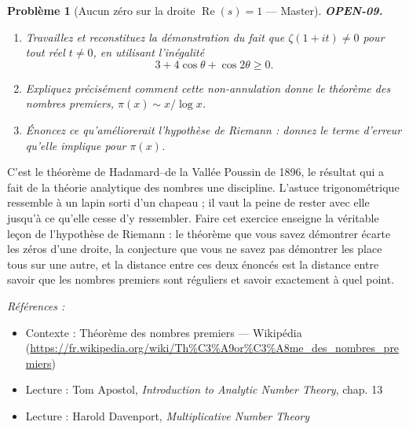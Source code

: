 \documentclass[11pt]{article}
\newtheorem{problem}{Problème}
\newenvironment{refs}{\par\small\noindent\emph{Références :}\begin{itemize}\setlength\itemsep{0pt}}{\end{itemize}\normalsize}
\begin{document}
\begin{problem}[{Aucun zéro sur la droite $ \operatorname{Re}(s) = 1 $ --- Master}]
\textbf{OPEN-09.} \begin{enumerate}
\item[(a)] Travaillez et reconstituez la démonstration du fait que $ \zeta(1 + it) \neq 0 $
pour tout réel $ t \neq 0 $, en utilisant l'inégalité
\[ 3 + 4\cos\theta + \cos 2\theta \geq 0 . \]
\item[(b)] Expliquez précisément comment cette non-annulation donne le théorème des nombres
premiers, $ \pi(x) \sim x / \log x $.
\item[(c)] Énoncez ce qu'améliorerait l'hypothèse de Riemann : donnez le terme d'erreur qu'elle
implique pour $ \pi(x) $.
\end{enumerate}

\end{problem}

\noindent C'est le théorème de Hadamard--de la Vallée Poussin de 1896, le résultat
qui a fait de la théorie analytique des nombres une discipline. L'astuce
trigonométrique ressemble à un lapin sorti d'un chapeau ; il vaut la peine de rester avec
elle jusqu'à ce qu'elle cesse d'y ressembler. Faire cet exercice enseigne la véritable
leçon de l'hypothèse de Riemann : le théorème que vous savez démontrer écarte les zéros
d'une droite, la conjecture que vous ne savez pas démontrer les place tous sur une autre,
et la distance entre ces deux énoncés est la distance entre savoir que les nombres
premiers sont réguliers et savoir exactement à quel point.

\begin{refs}
\item Contexte : Théorème des nombres premiers --- Wikipédia (\url{https://fr.wikipedia.org/wiki/Th%C3%A9or%C3%A8me_des_nombres_premiers})
\item Lecture : Tom Apostol, \textit{Introduction to Analytic Number Theory}, chap. 13
\item Lecture : Harold Davenport, \textit{Multiplicative Number Theory}
\end{refs}

\bigskip
\end{document}
